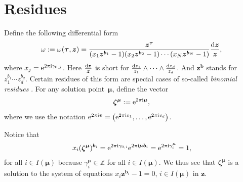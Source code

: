 \documentclass[pdftex]{sigma}
\numberwithin{equation}{section}
\begin{document}
\section{Residues}
\label{chap-res}
Define the following differential form
\begin{gather*}
\omega := \omega(\bm{\tau},\bm{z}) = \frac{\bm{z}^{\bm\tau}}{(x_1\bm{z}^{\bm{b}_1} - 1)(x_2\bm{z}^{\bm{b}_2} - 1) \cdots (x_N\bm{z}^{\bm{b}_N} - 1)} \frac{{\rm d}\bm{z}}{\bm{z}},
\end{gather*}
where $x_j={\rm e}^{2\pi {\rm i}\gamma_{0,j}}$.
Here $\frac{{\rm d}\bm{z}}{\bm{z}}$ is short for $\frac{{\rm d}z_1}{z_1} \wedge \dots \wedge \frac{{\rm d}z_d}{z_d}$. And $\bm{z}^{\bm{b}}$ stands for $z_1^{b_1}\cdots z_d^{b_d}$.
Certain residues of this form are special cases of so-called {\it binomial residues} \cite{Cat00}.
For any solution point~$\bm{\mu}$, define the vector
\begin{gather*}
\bm{\zeta}^{\bm{\mu}} := {\rm e}^{2\pi {\rm i} \bm{\mu}},
\end{gather*}
where we use the notation ${\rm e}^{2\pi {\rm i}\bm{v}}=\big({\rm e}^{2\pi {\rm i}v_1},\dots,{\rm e}^{2\pi {\rm i}v_d}\big)$.

Notice that
\begin{gather*}
x_i (\bm{\zeta}^{\bm{\mu}})^{\bm{b}_i}={\rm e}^{2\pi {\rm i}\gamma_{0,i}}
{\rm e}^{2\pi {\rm i}\bm{\mu}\bm{b}_i}={\rm e}^{2\pi {\rm i}\gamma^{\bm{\mu}}_i}=1,
\end{gather*}
for all $i\in I(\bm{\mu})$ because $\gamma^{\bm\mu}_i\in\mathbb{Z}$ for all $i\in I(\bm\mu)$.
We thus see that $\bm{\zeta}^{\bm\mu}$ is a solution to the system of equations
$x_i\bm{z}^{\bm{b}_i}-1=0$, $i\in I(\bm\mu)$ in $\bm{z}$.
\end{document}
